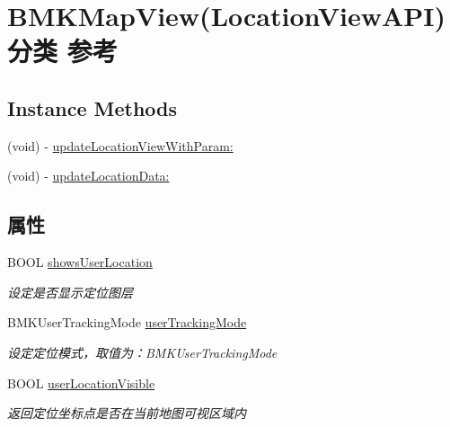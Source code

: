 \hypertarget{category_b_m_k_map_view_07_location_view_a_p_i_08}{\section{B\+M\+K\+Map\+View(Location\+View\+A\+P\+I)分类 参考}
\label{category_b_m_k_map_view_07_location_view_a_p_i_08}
}
\subsection*{Instance Methods}
\begin{DoxyCompactItemize}
\item 
(void) -\/ \hyperlink{category_b_m_k_map_view_07_location_view_a_p_i_08_afc9842b45a41341b3ea5d2e632344382}{update\+Location\+View\+With\+Param\+:}
\item 
(void) -\/ \hyperlink{category_b_m_k_map_view_07_location_view_a_p_i_08_a72c1c3b690379ecf804cc20ddf5840e9}{update\+Location\+Data\+:}
\end{DoxyCompactItemize}
\subsection*{属性}
\begin{DoxyCompactItemize}
\item 
\hypertarget{category_b_m_k_map_view_07_location_view_a_p_i_08_a6e18e9532c42e940eca7739378348af4}{B\+O\+O\+L \hyperlink{category_b_m_k_map_view_07_location_view_a_p_i_08_a6e18e9532c42e940eca7739378348af4}{shows\+User\+Location}}\label{category_b_m_k_map_view_07_location_view_a_p_i_08_a6e18e9532c42e940eca7739378348af4}

\begin{DoxyCompactList}\small\item\em 设定是否显示定位图层 \end{DoxyCompactList}\item 
\hypertarget{category_b_m_k_map_view_07_location_view_a_p_i_08_aac0adfff30441312452cef6844ef818b}{B\+M\+K\+User\+Tracking\+Mode \hyperlink{category_b_m_k_map_view_07_location_view_a_p_i_08_aac0adfff30441312452cef6844ef818b}{user\+Tracking\+Mode}}\label{category_b_m_k_map_view_07_location_view_a_p_i_08_aac0adfff30441312452cef6844ef818b}

\begin{DoxyCompactList}\small\item\em 设定定位模式，取值为：\+B\+M\+K\+User\+Tracking\+Mode \end{DoxyCompactList}\item 
\hypertarget{category_b_m_k_map_view_07_location_view_a_p_i_08_ada9feb9e53eb9611b57a596c572bb280}{B\+O\+O\+L \hyperlink{category_b_m_k_map_view_07_location_view_a_p_i_08_ada9feb9e53eb9611b57a596c572bb280}{user\+Location\+Visible}}\label{category_b_m_k_map_view_07_location_view_a_p_i_08_ada9feb9e53eb9611b57a596c572bb280}

\begin{DoxyCompactList}\small\item\em 返回定位坐标点是否在当前地图可视区域内 \end{DoxyCompactList}\end{DoxyCompactItemize}


